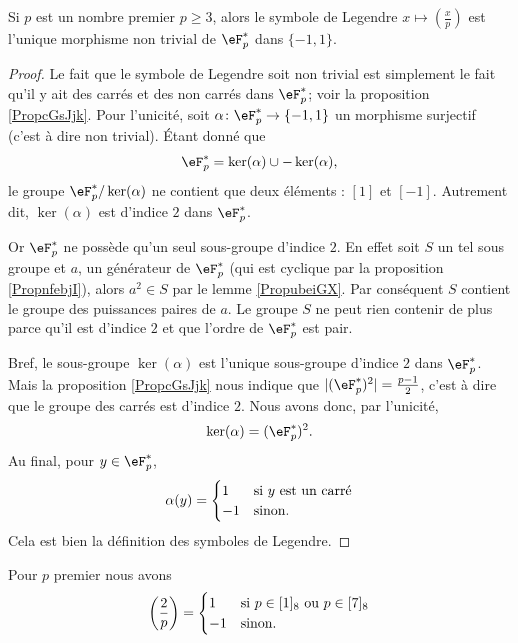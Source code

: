 \begin{lemma}\label{Lemoabzrn}
    Si \( p\) est un nombre premier \( p\geq 3\), alors le symbole de Legendre \( x\mapsto\left(\frac{x}{p}\right)\) est l'unique morphisme non trivial de \( \eF^*_p\) dans \( \{ -1,1 \}\).
\end{lemma}

\begin{proof}
    Le fait que le symbole de Legendre soit non trivial est simplement le fait qu'il y ait des carrés et des non carrés dans \( \eF_p^*\); voir la proposition \ref{PropcGsJjk}. Pour l'unicité, soit \( \alpha\colon \eF^*_p\to \{ -1,1 \}\) un morphisme surjectif (c'est à dire non trivial). Étant donné que 
    \begin{equation}
        \eF^*_p=\ker(\alpha)\cup-\ker(\alpha),
    \end{equation}
    le groupe \( \eF_p^*/\ker(\alpha)\) ne contient que deux éléments : \( [1]\) et \( [-1]\). Autrement dit, \( \ker(\alpha)\) est d'indice \( 2\) dans \( \eF_p^*\). 
    
    Or \( \eF_p^*\) ne possède qu'un seul sous-groupe d'indice \( 2\). En effet soit \( S\) un tel sous groupe et \( a\), un générateur de \( \eF_p^*\) (qui est cyclique par la proposition \ref{PropnfebjI}), alors \( a^2\in S\) par le lemme \ref{PropubeiGX}. Par conséquent \( S\) contient le groupe des puissances paires de \( a\). Le groupe $S$ ne peut rien contenir de plus parce qu'il est d'indice \( 2\) et que l'ordre de \( \eF_p^*\) est pair.

    Bref, le sous-groupe \( \ker(\alpha)\) est l'unique sous-groupe d'indice \( 2\) dans \( \eF_p^*\). Mais la proposition \ref{PropcGsJjk} nous indique que \( | (\eF_p^*)^2 |=\frac{ p-1 }{2}\), c'est à dire que le groupe des carrés est d'indice \( 2\). Nous avons donc, par l'unicité,
    \begin{equation}
        \ker(\alpha)=(\eF_p^*)^2.
    \end{equation}
    Au final, pour \( y\in \eF_p^*\),
    \begin{equation}
        \alpha(y)=\begin{cases}
           1 &   \text{si \( y\) est un carré}\\
            -1    &    \text{sinon.}
        \end{cases}
    \end{equation}
    Cela est bien la définition des symboles de Legendre.
\end{proof}
 
\begin{proposition}
    Pour \( p\) premier nous avons
    \begin{equation}
        \left(\frac{2}{p}\right)=\begin{cases}
            1    &   \text{si \( p\in [1]_8\) ou \( p\in [7]_8\)}\\
            -1    &    \text{sinon}.
        \end{cases}
    \end{equation}
\end{proposition}

